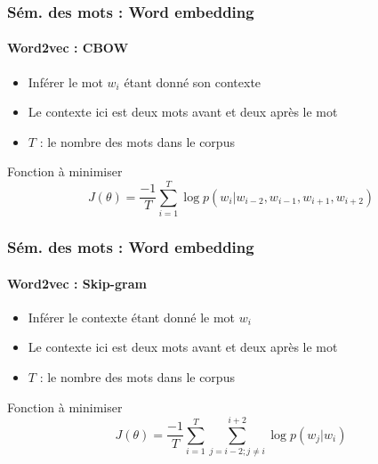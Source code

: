 \documentclass[xcolor=table]{beamer}
\begin{document}
\begin{frame}
	\frametitle{Sém. des mots : Word embedding}
	\framesubtitle{Word2vec : CBOW}
\begin{minipage}{.6\textwidth}
	\begin{itemize}
		\item Inférer le mot $w_i$ étant donné son contexte
		\item Le contexte ici est deux mots avant et deux après le mot
		\item $T$ : le nombre des mots dans le corpus
	\end{itemize}
	\begin{block}{Fonction à minimiser}
		\[%
		J(\theta) = \frac{-1}{T} \sum_{i=1}^{T} \log p(w_i |w_{i-2}, w_{i-1}, w_{i+1}, w_{i+2})
		\]
	\end{block}
\end{minipage}
\begin{minipage}{.08\textwidth}
\end{minipage}	
\begin{minipage}{.38\textwidth}
\end{minipage}
	
\end{frame}

\begin{frame}
	\frametitle{Sém. des mots : Word embedding}
	\framesubtitle{Word2vec : Skip-gram}
	\begin{minipage}{.58\textwidth}
		\begin{itemize}
			\item Inférer le contexte étant donné le mot $w_i$
			\item Le contexte ici est deux mots avant et deux après le mot
			\item $T$ : le nombre des mots dans le corpus
		\end{itemize}
		\begin{block}{Fonction à minimiser}
			\[%
			J(\theta) = \frac{-1}{T} \sum_{i=1}^{T} \sum_{j= i-2; j \ne i}^{i+2} \log p(w_j |w_i)
			\]
		\end{block}
	\end{minipage}
	\begin{minipage}{.08\textwidth}
	\end{minipage}
	\begin{minipage}{.4\textwidth}
	\end{minipage}
	
\end{frame}
\end{document}
